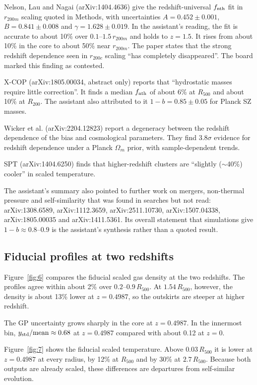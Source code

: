 \documentclass[11pt,a4paper]{article}
\begin{document}
Nelson, Lau and Nagai (arXiv:1404.4636) give the redshift-universal $f_{\rm nth}$ fit in $r_{200m}$ scaling quoted in Methods, with uncertainties $A=0.452\pm0.001$, $B=0.841\pm0.008$ and $\gamma=1.628\pm0.019$. In the assistant's reading, the fit is accurate to about 10\% over $0.1$--$1.5\,r_{200m}$ and holds to $z=1.5$. It rises from about 10\% in the core to about 50\% near $r_{200m}$. The paper states that the strong redshift dependence seen in $r_{200c}$ scaling ``has completely disappeared''. The board marked this finding as contested.

X-COP (arXiv:1805.00034, abstract only) reports that ``hydrostatic masses require little correction''. It finds a median $f_{\rm nth}$ of about 6\% at $R_{500}$ and about 10\% at $R_{200}$. The assistant also attributed to it $1-b=0.85\pm0.05$ for Planck SZ masses.

Wicker et al. (arXiv:2204.12823) report a degeneracy between the redshift dependence of the bias and cosmological parameters. They find $3.8\sigma$ evidence for redshift dependence under a Planck $\Omega_m$ prior, with sample-dependent trends.

SPT (arXiv:1404.6250) finds that higher-redshift clusters are ``slightly ($\sim$40\%) cooler'' in scaled temperature.

The assistant's summary also pointed to further work on mergers, non-thermal pressure and self-similarity that was found in searches but not read: arXiv:1308.6589, arXiv:1112.3659, arXiv:2511.10730, arXiv:1507.04338, arXiv:1805.00035 and arXiv:1411.5361. Its overall statement that simulations give $1-b\approx0.8$--$0.9$ is the assistant's synthesis rather than a quoted result.

\subsection{Fiducial profiles at two redshifts}
Figure~\ref{fig:6} compares the fiducial scaled gas density at the two redshifts. The profiles agree within about 2\% over $0.2$--$0.9\,R_{500}$. At $1.54\,R_{500}$, however, the density is about 13\% lower at $z=0.4987$, so the outskirts are steeper at higher redshift.

The GP uncertainty grows sharply in the core at $z=0.4987$. In the innermost bin, $y_{\rm std}/{\rm mean}\approx0.68$ at $z=0.4987$ compared with about 0.12 at $z=0$.






Figure~\ref{fig:7} shows the fiducial scaled temperature. Above $0.03\,R_{500}$ it is lower at $z=0.4987$ at every radius, by 12\% at $R_{500}$ and by 30\% at $2.7\,R_{500}$. Because both outputs are already scaled, these differences are departures from self-similar evolution.
\end{document}
